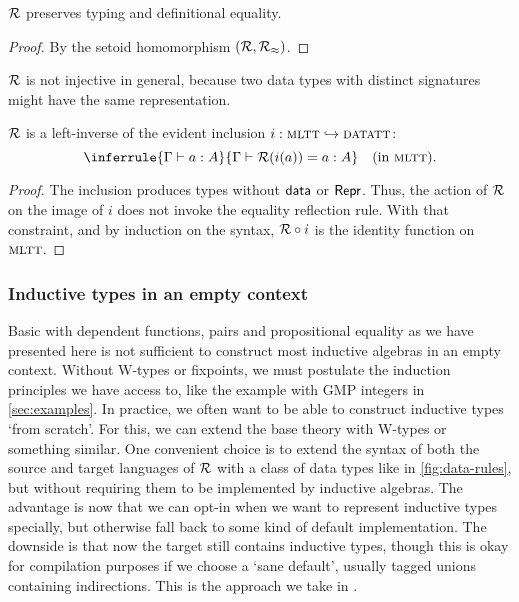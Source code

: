 \begin{theorem}
    $\mathcal{R}$ preserves typing and definitional equality.
    \begin{proof}
    By the setoid homomorphism $(\mathcal{R}, \mathcal{R}_\approx)$.
    \end{proof}
\end{theorem}

$\mathcal{R}$ is not injective in general, because two data types with distinct
signatures might have the same representation.

\begin{theorem}
    $\mathcal{R}$ is a left-inverse of the evident inclusion $i : {\textsc{mltt}}
    \hookrightarrow {\textsc{datatt}}$:
    \[
    \inferrule{\Gamma \vdash a : A}{\Gamma \vdash \R(i(a)) = a : A} \quad \text{(in \lambdamltt)}.
    \]
    \begin{proof}
        The inclusion produces types without $\textsf{data}$ or $\textsf{Repr}$. Thus, the
        action of $\mathcal{R}$ on the image of $i$ does not invoke the equality
        reflection rule. With that constraint, and by induction on the syntax,
        $\mathcal{R} \circ i$ is the identity function on ${\textsc{mltt}}$.
    \end{proof}
\end{theorem}

\subsubsection{Inductive types in an empty context}

Basic \lambdamltt with dependent functions, pairs and propositional equality as
we have presented here is not sufficient to construct most inductive algebras in
an empty context. Without W-types or fixpoints, we must postulate the induction
principles we have access to, like the example with GMP integers in
\cref{sec:examples}. In practice, we often want to be able to construct
inductive types `from scratch'. For this, we can extend the base theory
with W-types or something similar. One convenient choice is to extend
the syntax of both the source and target languages of $\mathcal{R}$ with a class of data
types like in \cref{fig:data-rules}, but without requiring them to be
implemented by inductive algebras. The advantage is now that we can opt-in when
we want to represent inductive types specially, but otherwise fall back to some
kind of default implementation. The downside is that now the target still
contains inductive types, though this is okay for compilation purposes if we
choose a `sane default', usually tagged unions containing indirections. This is
the approach we take in \superfluid.

